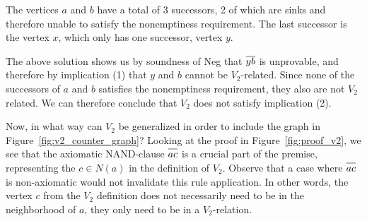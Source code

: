 The vertices $a$ and $b$ have a total of 3 successors, 2 of which are sinks and therefore unable to satisfy the nonemptiness requirement.
The last successor is the vertex $x$, which only has one successor, vertex $y$.\par
\begin{figure}[!h]
  \centering
  \caption{}
  \label{fig:v2_counter_assignment}
\end{figure}
\FloatBarrier
The above solution shows us by soundness of Neg that $\ol{yb}$ is unprovable, and therefore by implication (1) that $y$ and $b$ cannot be $V_2$-related.
Since none of the successors of $a$ and $b$ satisfies the nonemptiness requirement, they also are not $V_2$ related.
We can therefore conclude that $V_2$ does not satisfy implication (2).

Now, in what way can $V_2$ be generalized in order to include the graph in Figure~\ref{fig:v2_counter_graph}?
Looking at the proof in Figure~\ref{fig:proof_v2}, we see that the axiomatic NAND-clause $\ol{ac}$ is a crucial part of the premise, representing the $c \in N(a)$ in the definition of $V_2$.
Observe that a case where $\ol{ac}$ is non-axiomatic would not invalidate this rule application.
In other words, the vertex $c$ from the $V_2$ definition does not necessarily need to be in the neighborhood of $a$, they only need to be in a $V_2$-relation.

